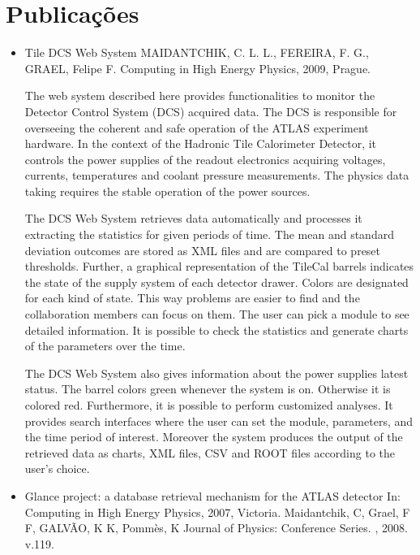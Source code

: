 \chapter{Publicações}

\begin{itemize}

\item Tile DCS Web System
MAIDANTCHIK, C. L. L., FEREIRA, F. G., GRAEL, Felipe F.
Computing in High Energy Physics, 2009, Prague.

The web system described here provides functionalities to monitor the Detector
Control System (DCS) acquired data. The DCS is responsible for overseeing the
coherent and safe operation of the ATLAS experiment hardware. In the context of
the Hadronic Tile Calorimeter Detector, it controls the power supplies of the
readout electronics acquiring voltages, currents, temperatures and coolant
pressure measurements. The physics data taking requires the stable operation of
the power sources.

The DCS Web System retrieves data automatically and processes it extracting the
statistics for given periods of time. The mean and standard deviation outcomes
are stored as XML files and are compared to preset thresholds. Further, a
graphical representation of the TileCal barrels indicates the state of the
supply system of each detector drawer. Colors are designated for each kind of
state. This way problems are easier to find and the collaboration members can
focus on them. The user can pick a module to see detailed information. It is
possible to check the statistics and generate charts of the parameters over the
time.

The DCS Web System also gives information about the power supplies latest
status. The barrel colors green whenever the system is on. Otherwise it is
colored red. Furthermore, it is possible to perform customized analyses. It
provides search interfaces where the user can set the module, parameters, and
the time period of interest. Moreover the system produces the output of the
retrieved data as charts, XML files, CSV and ROOT files according to the user's
choice.

\item Glance project: a database retrieval mechanism for the ATLAS detector
In: Computing in High Energy Physics, 2007, Victoria.
Maidantchik, C, Grael, F F, GALVÃO, K K, Pommès, K
 Journal of Physics: Conference Series. , 2008. v.119.


\end{itemize}
